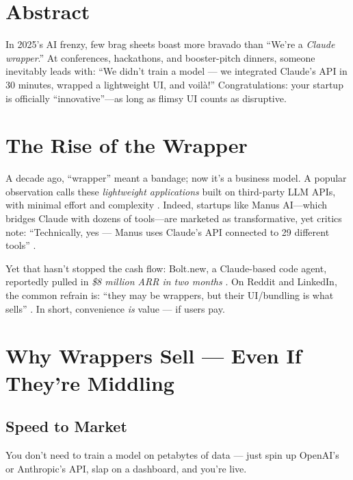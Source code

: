 




\section*{Abstract}

In 2025's AI frenzy, few brag sheets boast more bravado than ``We're a \emph{Claude wrapper}.''
At conferences, hackathons, and booster-pitch dinners, someone inevitably leads with:
``We didn't train a model --- we integrated Claude's API in 30 minutes, wrapped a lightweight UI, and voilà!''
Congratulations: your startup is officially ``innovative''---as long as flimsy UI counts as disruptive.

\section{The Rise of the Wrapper}

A decade ago, ``wrapper'' meant a bandage; now it's a business model.
A popular observation calls these \emph{lightweight applications} built on third-party LLM APIs, with minimal effort and complexity \cite{olivas2025linkedin}.
Indeed, startups like Manus AI---which bridges Claude with dozens of tools---are marketed as transformative,
yet critics note: ``Technically, yes --- Manus uses Claude's API connected to 29 different tools'' \cite{goldie2025manus}.

Yet that hasn't stopped the cash flow: Bolt.new, a Claude-based code agent, reportedly pulled in \emph{\$8 million ARR in two months} \cite{latent2025bolt}.
On Reddit and LinkedIn, the common refrain is: ``they may be wrappers, but their UI/bundling is what sells'' \cite{krunal2025hype}.
In short, convenience \emph{is} value --- if users pay.

\section{Why Wrappers Sell --- Even If They're Middling}

\subsection{Speed to Market}
You don't need to train a model on petabytes of data --- just spin up OpenAI's or Anthropic's API, slap on a dashboard, and you're live.

